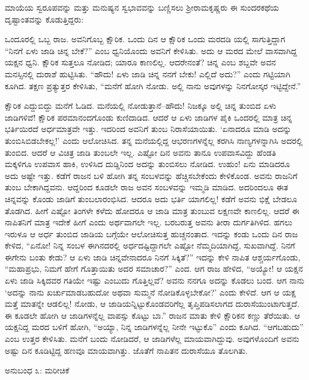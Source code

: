 ಮಾಯೆಯ ಸ್ವರೂಪವನ್ನು ಮತ್ತು ಮನುಷ್ಯನ ಸ್ವಭಾವವನ್ನು ಬಣ್ಣಿಸಲು ಶ್ರೀರಾಮಕೃಷ್ಣರು ಈ ಸುಂದರಕಥೆಯ ದೃಷ್ಟಾಂತವನ್ನು ಕೊಡುತ್ತಿದ್ದರು:

ಒಂದೂರಲ್ಲಿ ಒಬ್ಬ ರಾಜ. ಅವನಿಗೊಬ್ಬ ಕ್ಷೌರಿಕ. ಒಂದು ದಿನ ಆ ಕ್ಷೌರಿಕ ಒಂದು ಮರದಡಿ ಯಲ್ಲಿ ಸಾಗುತ್ತಿದ್ದಾಗ “ನಿನಗೆ ಏಳು ಜಾಡಿ ಚಿನ್ನ ಬೇಕೆ?” ಎಂಬ ಧ್ವನಿಯೊಂದು ಅವನಿಗೆ ಕೇಳಿಸಿತು. ಅದು ಆ ಮರದ ಮೇಲೆ ವಾಸವಾಗಿದ್ದ ಯಕ್ಷನ ಧ್ವನಿ. ಕ್ಷೌರಿಕ ಸುತ್ತಲೂ ನೋಡಿದ; ಯಾರೂ ಕಾಣಲಿಲ್ಲ. ಆದರೇನಂತೆ? ಚಿನ್ನ ಎಂಬ ಶಬ್ದವೇ ಅವನ ಮನಸ್ಸಿನಲ್ಲಿ ದುರಾಶೆ ಹುಟ್ಟಿಸಿತು. “ಹೌದು! ಏಳು ಜಾಡಿ ಚಿನ್ನ ನನಗೆ ಬೇಕು! ಎಲ್ಲಿದೆ ಅದು?” ಎಂದು ಗಟ್ಟಿಯಾಗಿ ಕೂಗಿದ. ತಕ್ಷಣ ಪ್ರತ್ಯುತ್ತರ ಕೇಳಿಸಿತು, “ಮನೆಗೆ ಹೋಗಿ ನೋಡು. ಅಲ್ಲಿ ನಾನು ಅವುಗಳನ್ನು ನಿನಗೋಸ್ಕರ ಇಟ್ಟಿದ್ದೇನೆ.”

ಕ್ಷೌರಿಕ ಎದ್ದುಬಿದ್ದು ಮನೆಗೆ ಓಡಿದ. ಮನೆಯಲ್ಲಿ ನೋಡುತ್ತಾನೆ–ಹೌದು! ನಿಜಕ್ಕೂ ಅಲ್ಲಿ ಚಿನ್ನ ತುಂಬಿದ ಏಳು ಜಾಡಿಗಳಿವೆ! ಕ್ಷೌರಿಕ ಪರಮಾನಂದಗೊಂಡು ಕುಣಿದಾಡಿದ. ಆದರೆ ಆ ಏಳು ಜಾಡಿಗಳ ಪೈಕಿ ಒಂದರಲ್ಲಿ ಮಾತ್ರ ಚಿನ್ನ ಭರ್ತಿಯಿರದೆ ಅರ್ಧಮಾತ್ರವೇ ಇತ್ತು. ಇದರಿಂದ ಅವನಿಗೆ ತುಂಬ ನಿರಾಸೆಯಾಯಿತು. ‘ಏನಾದರೂ ಮಾಡಿ ಅದನ್ನು ತುಂಬಿಸಿಬಿಡಬೇಕಲ್ಲ!’ ಎಂದು ಆಲೋಚಿಸಿದ. ತನ್ನ ಮನೆಯಲ್ಲಿದ್ದ ಆಭರಣಗಳನ್ನೆಲ್ಲ ಕರಗಿಸಿ ನಾಣ್ಯಗಳನ್ನಾಗಿಸಿ ಅದರಲ್ಲಿ ತುಂಬಿದ. ಆದರೆ ಆ ವಿಚಿತ್ರ ಜಾಡಿ ತುಂಬಲೇ ಇಲ್ಲ. ಎಷ್ಟೋ ದಿನ ಅವನು ತಾನೂ ಉಪವಾಸವಿದ್ದು ಹೆಂಡತಿ ಮಕ್ಕಳಿಗೂ ಉಪವಾಸ ಹಾಕಿ, ಉಳಿಸಿದ ದುಡ್ಡಿನಿಂದ ಅದನ್ನು ತುಂಬಿಸಲು ನೋಡಿದ. ಉಹುಂ! ಏನು ಮಾಡಿದರೂ ಅದು ಅಷ್ಟೇ ಇತ್ತು. ಕಡೆಗೆ ರಾಜನ ಬಳಿ ಹೋಗಿ ತನ್ನ ಸಂಬಳವನ್ನು ಹೆಚ್ಚಿಸಬೇಕೆಂದು ಕೇಳಿಕೊಂಡ. ಅವನು ರಾಜನಿಗೆ ತುಂಬ ಬೇಕಾಗಿದ್ದವನು. ಆದ್ದರಿಂದ ಕೂಡಲೇ ರಾಜ ಅವನ ಸಂಬಳವನ್ನು ಇಮ್ಮಡಿ ಮಾಡಿದ. ಅದರಿಂದಲೂ ಈತ ಚಿನ್ನವನ್ನು ಕೊಂಡು ಜಾಡಿಗೆ ತುಂಬಲಾರಂಭಿಸಿದ. ಆದರೂ ಅದು ಭರ್ತಿ ಯಾಗಲಿಲ್ಲ! ಕಡೆಗೆ ಅವನು ಭಿಕ್ಷೆ ಬೇಡಲೂ ತೊಡಗಿದ. ಹೀಗೆ ಎಷ್ಟೋ ತಿಂಗಳೇ ಕಳೆದು ಹೋದರೂ ಆ ಜಾಡಿ ಮಾತ್ರ ತುಂಬುವ ಲಕ್ಷಣವೇ ಕಾಣಲಿಲ್ಲ. ಆದರೆ ಈ ನಾಪಿತನಿಗೆ ಮಾತ್ರ ಇದೇಕೆ ಹೀಗೆ ಎಂದು ಅರ್ಥವಾಗಲೇ ಇಲ್ಲ. ಬರಬರುತ್ತ ಅವನು ತೀರಾ ದುರ್ಗತಿಗಿಳಿದ. ಹಗಲು ಇರುಳೂ ಆ ಅರ್ಧ ತುಂಬಿದ ಜಾಡಿಯ ಬಗ್ಗೆಯೇ ಆಲೋಚಿಸುತ್ತ ಹುಚ್ಚನಂತಾದ. ಇದನ್ನು ಕಂಡು ಒಂದು ದಿನ ರಾಜ ಕೇಳಿದ, “ಏನೋ! ನಿನ್ನ ಸಂಬಳ ಈಗಿನದರಲ್ಲಿ ಅರ್ಧದಷ್ಟಿದ್ದಾಗಲೇ ಎಷ್ಟೋ ನೆಮ್ಮದಿಯಾಗಿದ್ದೆ, ಸುಖವಾಗಿದ್ದೆ. ನಿನಗೆ ಈಗೇನು ಬಂತು ಕೇಡು? ಆ ಏಳು ಜಾಡಿ ಚಿನ್ನವೇನಾದರೂ ನಿನಗೆ ಸಿಕ್ಕಿತೆ?” ಇದನ್ನು ಕೇಳಿ ನಾಪಿತ ಆಶ್ಚರ್ಯಗೊಂಡು, “ಮಹಾಪ್ರಭು, ನಿಮಗೆ ಹೇಗೆ ಗೊತ್ತಾಯಿತು ಅದರ ಸಮಾಚಾರ?” ಎಂದ. ಆಗ ರಾಜ ಹೇಳಿದ, “ಅಯ್ಯೋ! ಆ ಯಕ್ಷನ ಏಳು ಜಾಡಿ ಸಿಕ್ಕಿದವರ ಗತಿಯೇ ಇಷ್ಟು ಎಂಬುದು ಗೊತ್ತಿಲ್ಲವೆ? ಅವನು ನನಗೂ ಅದನ್ನು ಕೊಡಲು ಬಂದ. ಆಗ ನಾನು ‘ಅದನ್ನು ನಾನು ಖರ್ಚುಮಾಡಬಹುದೋ ಅಥವಾ ಸುಮ್ಮನೆ ನೋಡಿಕೊಳ್ಳಬೇಕೋ?’ ಎಂದು ಕೇಳಿದೆ. ಆಗ ಆ ಯಕ್ಷ ಮತ್ತೆ ಮಾತನ್ನೇ ಆಡಲಿಲ್ಲ! ನೋಡು, ಆ ಜಾಡಿಯನ್ನಿಟ್ಟುಕೊಂಡವರಿಗೆಲ್ಲ ತೃಪ್ತಿಪಡಿಸಲಾಗದ ದುರಾಸೆಯುಂಟಾಗುತ್ತದೆ. ಈ ಕೂಡಲೇ ಹೋಗಿ ಆ ಜಾಡಿಗಳನ್ನೆಲ್ಲ ವಾಪಸ್ಸು ಕೊಟ್ಟು ಬಾ.” ರಾಜನ ಮಾತು ಕೇಳಿ ಕ್ಷೌರಿಕನ ಕಣ್ಣು ತೆರೆಯಿತು. ಆ ಯಕ್ಷನಿದ್ದ ಮರದ ಬಳಿಗೆ ಹೋಗಿ, “ಅಯ್ಯಾ, ನಿನ್ನ ಜಾಡಿಗಳನ್ನೆಲ್ಲ ನೀನೇ ಇಟ್ಟುಕೊ” ಎಂದು ಕೂಗಿದ. “ಆಗಬಹುದು” ಎಂಬ ಉತ್ತರ ಕೇಳಿಸಿತು. ಮನೆಗೆ ಬಂದು ನೋಡಿದರೆ, ಆ ಜಾಡಿಗಳೆಲ್ಲ ಮಾಯವಾಗಿದ್ದುವು. ಅವುಗಳೊಂದಿಗೆ ಅವನು ಅಷ್ಟು ದಿನ ಕೂಡಿಟ್ಟಿದ್ದ ಹಣವೂ ಮಾಯವಾಗಿತ್ತು. ಜೊತೆಗೆ ನಾಪಿತನ ದುರಾಸೆಯೂ ತೊಲಗಿತು.


\begin{center}
ಅನುಬಂಧ ೩: ಮರೀಚಿಕೆ
\end{center}

